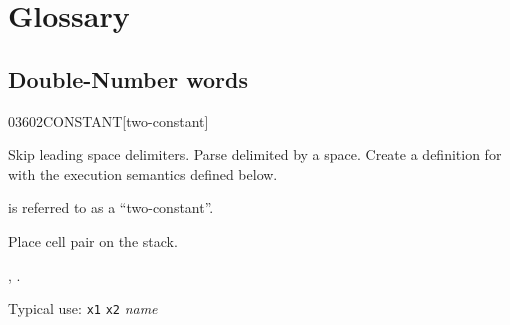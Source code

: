 \section{Glossary} %

\subsection{Double-Number words} %

\begin{worddef}{0360}{2CONSTANT}[two-constant]
\item {}

	Skip leading space delimiters. Parse  delimited by
	a space. Create a definition for  with the execution
	semantics defined below.

	 is referred to as a ``two-constant''.

\execute[name]

	Place cell pair  on the stack.

\see {},
	.


	\begin{rationale} %
		Typical use:
			\texttt{x1} \texttt{x2}  \emph{name}
	\end{rationale}

	\begin{testing}
		 \\

		 \\

		 \\
		 \\
	\end{testing}
\end{worddef}


